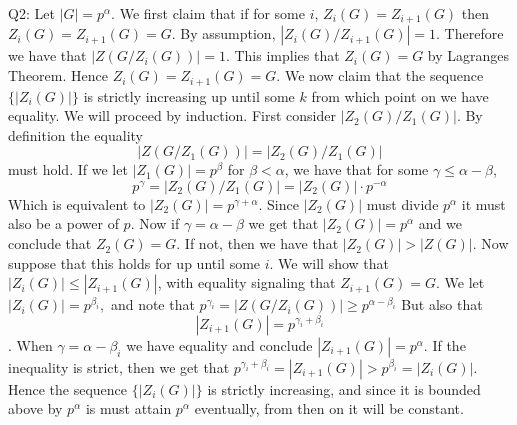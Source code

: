 \documentclass[letterpaper]{article}
\begin{document}
\noindent Q2: Let $|G|= p^\alpha$. We first claim that if for some $i$, $Z_i(G) = Z_{i+1}(G)$ then $Z_i(G)=Z_{i+1}(G) = G$. By assumption, $|Z_i(G) / Z_{i+1}(G)| = 1$. 
Therefore we have that $|Z(G / Z_i(G))| = 1$. This implies that $Z_i(G) = G$ by Lagranges Theorem. Hence $Z_i(G) = Z_{i+1}(G) = G$. We now claim that the sequence $\{ |Z_i(G)| \}$ is strictly increasing up until some $k$ from which point on we have equality. We will proceed by induction. First consider $|Z_2(G) / Z_1(G)|.$ By definition the equality $$|Z(G / Z_1(G))| = |Z_2(G) / Z_1(G)|$$ must hold. If we let $|Z_1(G)| = p^\beta$ for $\beta < \alpha$, we have that for some $\gamma \leq  \alpha - \beta$, $$p^\gamma = |Z_2(G) / Z_1(G)| = |Z_2(G)| \cdot p^{-\alpha}$$ Which is equivalent to $|Z_2(G)| = p^{\gamma + \alpha}$. Since $|Z_2(G)|$ must divide $p^\alpha$ it must also be a power of $p$. Now if $\gamma = \alpha - \beta$ we get that $|Z_2(G)| = p^\alpha$ and we conclude that $Z_2(G) = G$. If not, then we have that $|Z_2(G)| > |Z(G)|$. Now suppose that this holds for up until some $i$. We will show that $|Z_i(G)| \leq |Z_{i+1}(G)|$, with equality signaling that $Z_{i+1}(G)=G$. We let $|Z_{i}(G)| = p^{\beta_i},$ and note that $p^{\gamma_i} = |Z(G / Z_{i}(G) )| \geq p^{\alpha - \beta_i} $ But also that $$ |Z_{i+1}(G)| = p^{\gamma_i + \beta_i}$$. When $\gamma = \alpha - \beta_i$ we have equality and conclude $|Z_{i+1}(G)| = p^\alpha$. If the inequality is strict, then we get that $p^{\gamma_i + \beta_i } =|Z_{i+1}(G)| > p^{\beta_i} = |Z_{i}(G)|$.
Hence the sequence $\{|Z_i(G)| \}$ is strictly increasing, and since it is bounded above by $p^\alpha$ is must attain $p^\alpha$ eventually, from then on it will be constant. 
\end{document}
